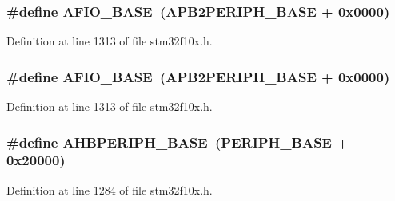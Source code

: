 \subsubsection[{\texorpdfstring{A\+F\+I\+O\+\_\+\+B\+A\+SE}{AFIO_BASE}}]{\setlength{\rightskip}{0pt plus 5cm}\#define A\+F\+I\+O\+\_\+\+B\+A\+SE~({\bf A\+P\+B2\+P\+E\+R\+I\+P\+H\+\_\+\+B\+A\+SE} + 0x0000)}\hypertarget{group___peripheral__memory__map_ga5f7e3eacfcf4c313c25012795148a680}{}\label{group___peripheral__memory__map_ga5f7e3eacfcf4c313c25012795148a680}


Definition at line 1313 of file stm32f10x.\+h.

\subsubsection[{\texorpdfstring{A\+F\+I\+O\+\_\+\+B\+A\+SE}{AFIO_BASE}}]{\setlength{\rightskip}{0pt plus 5cm}\#define A\+F\+I\+O\+\_\+\+B\+A\+SE~({\bf A\+P\+B2\+P\+E\+R\+I\+P\+H\+\_\+\+B\+A\+SE} + 0x0000)}\hypertarget{group___peripheral__memory__map_ga5f7e3eacfcf4c313c25012795148a680}{}\label{group___peripheral__memory__map_ga5f7e3eacfcf4c313c25012795148a680}


Definition at line 1313 of file stm32f10x.\+h.

\subsubsection[{\texorpdfstring{A\+H\+B\+P\+E\+R\+I\+P\+H\+\_\+\+B\+A\+SE}{AHBPERIPH_BASE}}]{\setlength{\rightskip}{0pt plus 5cm}\#define A\+H\+B\+P\+E\+R\+I\+P\+H\+\_\+\+B\+A\+SE~({\bf P\+E\+R\+I\+P\+H\+\_\+\+B\+A\+SE} + 0x20000)}\hypertarget{group___peripheral__memory__map_ga92eb5d49730765d2abd0f5b09548f9f5}{}\label{group___peripheral__memory__map_ga92eb5d49730765d2abd0f5b09548f9f5}


Definition at line 1284 of file stm32f10x.\+h.

